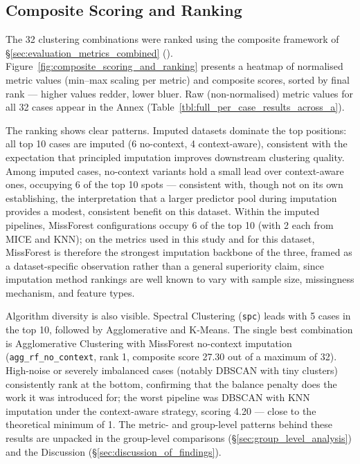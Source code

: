 \subsection{Composite Scoring and Ranking}

The 32 clustering combinations were ranked using the composite framework of \S\ref{sec:evaluation_metrics_combined} (). Figure~\ref{fig:composite_scoring_and_ranking} presents a heatmap of normalised metric values (min--max scaling per metric) and composite scores, sorted by final rank --- higher values redder, lower bluer. Raw (non-normalised) metric values for all 32 cases appear in the Annex (Table~\ref{tbl:full_per_case_results_across_a}).

The ranking shows clear patterns. Imputed datasets dominate the top positions: all top 10 cases are imputed (6 no-context, 4 context-aware), consistent with the expectation that principled imputation improves downstream clustering quality. Among imputed cases, no-context variants hold a small lead over context-aware ones, occupying 6 of the top 10 spots --- consistent with, though not on its own establishing, the interpretation that a larger predictor pool during imputation provides a modest, consistent benefit on this dataset. Within the imputed pipelines, MissForest configurations occupy 6 of the top 10 (with 2 each from MICE and KNN); on the metrics used in this study and for this dataset, MissForest is therefore the strongest imputation backbone of the three, framed as a dataset-specific observation rather than a general superiority claim, since imputation method rankings are well known to vary with sample size, missingness mechanism, and feature types.

Algorithm diversity is also visible. Spectral Clustering (\texttt{spc}) leads with 5 cases in the top 10, followed by Agglomerative and K-Means. The single best combination is Agglomerative Clustering with MissForest no-context imputation (\texttt{agg\_rf\_no\_context}, rank 1, composite score 27.30 out of a maximum of 32). High-noise or severely imbalanced cases (notably DBSCAN with tiny clusters) consistently rank at the bottom, confirming that the balance penalty does the work it was introduced for; the worst pipeline was DBSCAN with KNN imputation under the context-aware strategy, scoring 4.20 --- close to the theoretical minimum of 1. The metric- and group-level patterns behind these results are unpacked in the group-level comparisons (\S\ref{sec:group_level_analysis}) and the Discussion (\S\ref{sec:discussion_of_findings}).

